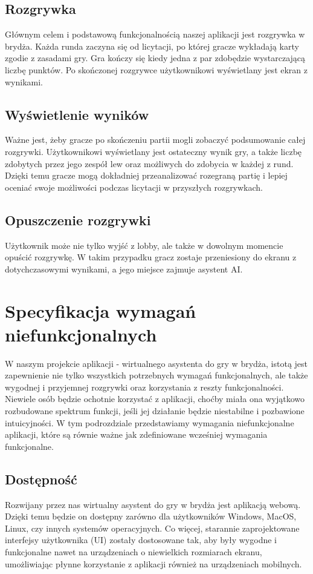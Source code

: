 \subsection{Rozgrywka}
Głównym celem i podstawową funkcjonalnością naszej aplikacji jest rozgrywka w brydża. Każda runda zaczyna się od licytacji, po której gracze wykładają karty zgodie z zasadami gry. Gra kończy się kiedy jedna z par zdobędzie wystarczającą liczbę punktów. Po skończonej rozgrywce użytkownikowi wyświetlany jest ekran z wynikami.
\subsection{Wyświetlenie wyników}
Ważne jest, żeby gracze po skończeniu partii mogli zobaczyć podsumowanie całej rozgrywki. Użytkownikowi wyświetlany jest ostateczny wynik gry, a także liczbę zdobytych przez jego zespół lew oraz możliwych do zdobycia w każdej z rund. Dzięki temu gracze mogą dokładniej przeanalizować rozegraną partię i lepiej oceniać swoje możliwości podczas licytacji w przyszłych rozgrywkach. 
\subsection{Opuszczenie rozgrywki}
Użytkownik może nie tylko wyjść z lobby, ale także w dowolnym momencie opuścić rozgrywkę. W takim przypadku gracz zostaje przeniesiony do ekranu z dotychczasowymi wynikami, a jego miejsce zajmuje asystent AI.

\section{Specyfikacja wymagań niefunkcjonalnych}
W naszym projekcie aplikacji - wirtualnego asystenta do gry w brydża, istotą jest zapewnienie nie tylko wszystkich potrzebnych wymagań funkcjonalnych, ale także wygodnej i przyjemnej rozgrywki oraz korzystania z reszty funkcjonalności. Niewiele osób będzie ochotnie korzystać z aplikacji, choćby miała ona wyjątkowo rozbudowane spektrum funkcji, jeśli jej działanie będzie niestabilne i pozbawione intuicyjności. W tym podrozdziale przedstawiamy wymagania niefunkcjonalne aplikacji, które są równie ważne jak zdefiniowane wcześniej wymagania funkcjonalne.
\subsection{Dostępność}
Rozwijany przez nas wirtualny asystent do gry w brydża jest aplikacją webową. Dzięki temu będzie on dostępny zarówno dla użytkowników Windows, MacOS, Linux, czy innych systemów operacyjnych. Co więcej, starannie zaprojektowane interfejsy użytkownika (UI) zostały dostosowane tak, aby były wygodne i funkcjonalne nawet na urządzeniach o niewielkich rozmiarach ekranu, umożliwiając płynne korzystanie z aplikacji również na urządzeniach mobilnych.

